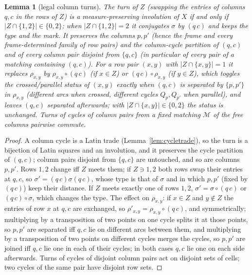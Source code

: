 \documentclass[11pt]{article}
\newtheorem{lemma}[theorem]{Lemma}
\theoremstyle{definition}
\begin{document}
\begin{lemma}[legal column turns]\label{lem:legalturn}
The turn of $Z$ (swapping the entries of columns $q,c$ in the rows of
$Z$) is a measure-preserving involution of $X$ if and only if
$|Z\cap\{1,2\}|\in\{0,2\}$; when $|Z\cap\{1,2\}|=2$ it conjugates
$\sigma$ by $(q\,c)$ and keeps the type and the mark.  It preserves the
columns $p,p'$ (hence the frame and every frame-determined family of
row pairs) and the column-cycle partition of $(q,c)$ and of every
column pair disjoint from $\{q,c\}$ (in particular of every pair of
a matching containing $(q,c)$).
For a row pair $(x,y)$ with $|Z\cap\{x,y\}|=1$ it replaces
$\rho_{x,y}$ by $\rho_{x,y}\circ(q\,c)$ (if $x\in Z$) or
$(q\,c)\circ\rho_{x,y}$ (if $y\in Z$), which toggles the
crossed/parallel status of $(x,y)$ exactly when $(q,c)$ is separated
by $\{p,p'\}$ in $\rho_{x,y}$ (different arcs when crossed, different
cycles $Q_p,Q_{p'}$ when parallel), and leaves $(q,c)$ separated
afterwards; with $|Z\cap\{x,y\}|\in\{0,2\}$ the status is unchanged.
Turns of cycles of column pairs from a fixed matching $\mathcal M$ of
the free columns pairwise commute.
\end{lemma}

\begin{proof}
A column cycle is a Latin trade (Lemma~\ref{lem:cycletrade}), so the
turn is a bijection of Latin squares and an involution, and it
preserves the cycle partition of $(q,c)$; column pairs disjoint from
$\{q,c\}$ are untouched, and so are columns $p,p'$.  Rows $1,2$ change
iff $Z$ meets them; if $Z\ni1,2$ both rows swap their entries at
$q,c$, so $\sigma'=(q\,c)\sigma(q\,c)$, whose type is that of $\sigma$
and in which $p,p'$ (fixed by $(q\,c)$) keep their distance.  If $Z$
meets exactly one of rows $1,2$, $\sigma'=\sigma\circ(q\,c)$ or
$(q\,c)\circ\sigma$, which changes the type.  The effect on $\rho_{x,y}$: if $x\in Z$ and $y\notin Z$ the entries of row $x$ at $q,c$ are exchanged, so $\rho'_{x,y}=\rho_{x,y}\circ(q\,c)$, and symmetrically; multiplying by a transposition of two points on one cycle splits it at those points, so $p,p'$ are separated iff $q,c$ lie on different arcs between them, and multiplying by a transposition of two points on different cycles merges the cycles, so $p,p'$ are joined iff $q,c$ lie one in each of their cycles; in both cases $q,c$ lie one on each side afterwards.  Turns of cycles of
disjoint column pairs act on disjoint sets of cells; two cycles of the
same pair have disjoint row sets.
\end{proof}
\end{document}
